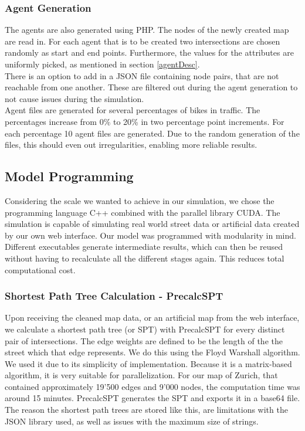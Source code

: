 \subsubsection{Agent Generation}
The agents are also generated using PHP. The nodes of the newly created map are read in. For each agent that is to be created two intersections are chosen randomly as start and end points. Furthermore, the values for the attributes are uniformly picked, as mentioned in section \ref{agentDesc}.\\
There is an option to add in a JSON file containing node pairs, that are not reachable from one another. These are filtered out during the agent generation to not cause issues during the simulation.\\
Agent files are generated for several percentages of bikes in traffic. The percentages increase from 0\% to 20\% in two percentage point increments. For each percentage 10 agent files are generated. Due to the random generation of the files, this should even out irregularities, enabling more reliable results.

\subsection{Model Programming}

Considering the scale we wanted to achieve in our simulation, we chose the programming language C++ combined with the parallel library CUDA. The simulation is capable of simulating real world street data or artificial data created by our own web interface. Our model was programmed with modularity in mind. Different executables generate intermediate results, which can then be reused without having to recalculate all the different stages again. This reduces total computational cost.

\subsubsection{Shortest Path Tree Calculation - PrecalcSPT}
Upon receiving the cleaned map data, or an artificial map from the web interface, we calculate a shortest path tree (or SPT) with PrecalcSPT for every distinct pair of intersections. The edge weights are defined to be the length of the the street which that edge represents. We do this using the Floyd Warshall algorithm. We used it due to its simplicity of implementation. Because it is a matrix-based algorithm, it is very suitable for parallelization. For our map of Zurich, that contained approximately 19'500 edges and 9'000 nodes, the computation time was around 15 minutes. PrecalcSPT generates the SPT and exports it in a base64 file. The reason the shortest path trees are stored like this, are limitations with the JSON library used, as well as issues with the maximum size of strings.

